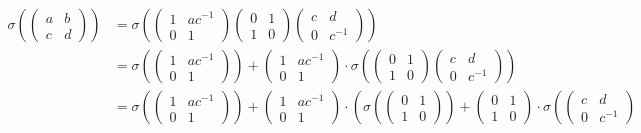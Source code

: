	\begin{align*}
	\sigma\left(
			\left(\begin{matrix}a & b \\ c & d\end{matrix}\right)
			\right) &=
	\sigma\left(
			\left(\begin{matrix} 1 & ac^{-1} \\ 0 & 1 \end{matrix}\right)
			\left(\begin{matrix} 0 & 1 \\ 1 & 0 \end{matrix}\right)
			\left(\begin{matrix} c & d \\ 0 & c^{-1} \end{matrix}\right)
			\right) \\
		&=
	\sigma\left(
			\left(\begin{matrix} 1 & ac^{-1} \\ 0 & 1 \end{matrix}\right)
			\right) + 
	\left(\begin{matrix} 1 & ac^{-1} \\ 0 & 1 \end{matrix}\right)\cdot
	\sigma\left(
			\left(\begin{matrix} 0 & 1 \\ 1 & 0 \end{matrix}\right)
			\left(\begin{matrix} c & d \\ 0 & c^{-1} \end{matrix}\right)
			\right) \\
		&=
	\sigma\left(
			\left(\begin{matrix} 1 & ac^{-1} \\ 0 & 1 \end{matrix}\right)
			\right) + 
	\left(\begin{matrix} 1 & ac^{-1} \\ 0 & 1 \end{matrix}\right)\cdot
	\left(
			\sigma\left(
				\left(\begin{matrix} 0 & 1 \\ 1 & 0 \end{matrix}\right)
				\right) +
			\left(\begin{matrix} 0 & 1 \\ 1 & 0 \end{matrix}\right)\cdot
			\sigma\left(
				\left(\begin{matrix} c & d \\ 0 & c^{-1} \end{matrix}\right)

\end{align*}
